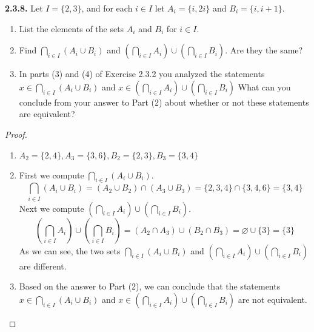 \documentclass[12pt]{amsart}
\newenvironment{statement}[1]{\smallskip\noindent\color[rgb]{.6627, .3529, .6314} {\bf #1.}}{}
\theoremstyle{definition}
\theoremstyle{remark}
\begin{document}
\begin{statement}{2.3.8}
Let $I = \{ 2, 3 \}$, and for each $i \in I$ let $A_i = \{ i, 2i \}$ and $B_i = \{ i, i + 1 \}$.
\begin{enumerate}
	\item List the elements of the sets $A_i$ and $B_i$ for $i \in I$.
	
	\item Find $\bigcap_{i \in I} (A_i \cup B_i)$
	and $\left( \bigcap_{i \in I} A_i \right) \cup \left( \bigcap_{i \in I} B_i \right)$.
	Are they the same?
	
	\item In parts (3) and (4) of Exercise 2.3.2 you analyzed the statements
	$x \in \bigcap_{i \in I} (A_i \cup B_i)$ and
	$x \in \left( \bigcap_{i \in I} A_i \right) \cup \left( \bigcap_{i \in I} B_i \right)$
	What can you conclude from your answer to Part (2) about whether or not
	these statements are equivalent?
\end{enumerate}
\end{statement}

\begin{proof}
\hfill
\begin{enumerate}
	\item $A_2 = \{ 2, 4 \}, A_3 = \{ 3, 6 \}, B_2 = \{ 2, 3 \}, B_3 = \{ 3, 4 \}$
	
	\item First we compute $\bigcap_{i \in I} (A_i \cup B_i)$.
	\begin{equation*}
		\bigcap_{i \in I} (A_i \cup B_i)
		= (A_2 \cup B_2) \cap (A_3 \cup B_3)
		= \{ 2, 3, 4 \} \cap \{ 3, 4, 6 \}
		= \{ 3, 4 \}
	\end{equation*}
	Next we compute $\left( \bigcap_{i \in I} A_i \right) \cup \left( \bigcap_{i \in I} B_i \right)$.
	\begin{equation*}
		\left( \bigcap_{i \in I} A_i \right) \cup \left( \bigcap_{i \in I} B_i \right)
		= (A_2 \cap A_3) \cup (B_2 \cap B_3)
		= \varnothing \cup \{ 3 \}
		= \{ 3 \}
	\end{equation*}
	As we can see, the two sets $\bigcap_{i \in I} (A_i \cup B_i)$ and
	$\left( \bigcap_{i \in I} A_i \right) \cup \left( \bigcap_{i \in I} B_i \right)$ are different.
	
	\item Based on the answer to Part (2), we can conclude that the statements
	$x \in \bigcap_{i \in I} (A_i \cup B_i)$ and
	$x \in \left( \bigcap_{i \in I} A_i \right) \cup \left( \bigcap_{i \in I} B_i \right)$
	are not equivalent.
\end{enumerate}
\end{proof}
\end{document}
